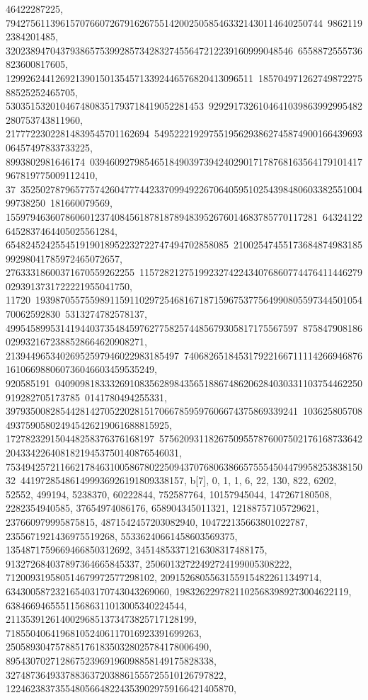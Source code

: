 {{{46422287225, 7942756113961570766072679162675514200250585463321430114640250744\
98621192384201485, 3202389470437938657539928573428327455647212239160999048546\
6558872555736823600817605, 12992624412692139015013545713392446576820413096511\
18570497126274987227588525252465705, 5303515320104674808351793718419052281453\
9292917326104641039863992995482280753743811960, 21777223022814839545701162694\
54952221929755195629386274587490016643969306457497833733225, 8993802981646174\
0394609279854651849039739424029017178768163564179101417967819775009112410, 37\
35250278796577574260477744233709949226706405951025439848060338255100499738250\
181660079569, 155979463607860601237408456187818789483952676014683785770117281\
643241226452837464405025561284, 654824524255451919018952232722747494702858085\
2100254745517368487498318599298041785972465072657, 27633318600371670559262255\
1157282127519923274224340768607744764114462790293913731722221955041750, 11720\
19398705575598911591102972546816718715967537756499080559734450105470062592830\
5313274782578137, 49954589953141944037354845976277582574485679305817175567597\
8758479081860299321672388528664620908271, 21394496534026952597946022983185497\
740682651845317922166711114266946876161066988060736046603459535249, 920585191\
04090981833326910835628984356518867486206284030331103754462250919282705173785\
0141780494255331, 39793500828544281427052202815170667859597606674375869339241\
103625805708493759058024945426219061688815925, 172782329150448258376376168197\
5756209311826750955787600750217616873364220433422640818219453750140876546031, 
   75349425721166217846310058678022509437076806386657555450447995825383815032\
441972854861499936926191809338157}}, 
 {b[7], {0, 1, 1, 6, 22, 130, 822, 6202, 52552, 499194, 5238370, 60222844, 
   752587764, 10157945044, 147267180508, 2282354940585, 37654974086176, 
   658904345011321, 12188757105729621, 237660979995875815, 
   4871542457203082940, 104722135663801022787, 2355671921436975519268, 
   55336240661458603569375, 1354871759669466850312692, 
   34514853371216308317488175, 913272684037897364665845337, 
   25060132722492724199005308222, 712009319580514679972577298102, 
   20915268055631559154822611349714, 634300587232165403170743043269060, 
   19832622978211025683989273004622119, 638466946555115686311013005340224544, 
   21135391261400296851373473825717128199, 
   718550406419681052406117016923391699263, 
   25058930475788517618350328025784178006490, 
   895430702712867523969196098858149175828338, 
   32748736493378836372038861555725510126797822, 
   1224623837355480566482243539029759166421405870, 
}}}

